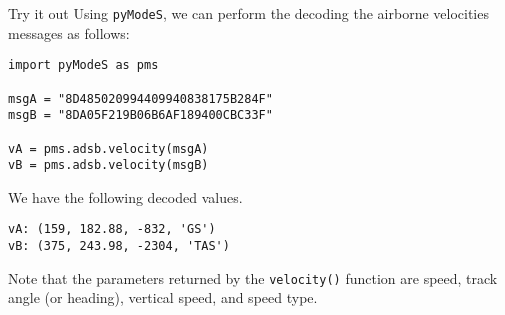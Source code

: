 \begin{notebox}{Try it out}
Using \texttt{pyModeS}, we can perform the decoding the airborne velocities messages as follows: 

\begin{verbatim}
import pyModeS as pms

msgA = "8D485020994409940838175B284F"
msgB = "8DA05F219B06B6AF189400CBC33F"

vA = pms.adsb.velocity(msgA)
vB = pms.adsb.velocity(msgB)
\end{verbatim}

We have the following decoded values.

\begin{verbatim}
vA: (159, 182.88, -832, 'GS')
vB: (375, 243.98, -2304, 'TAS')
\end{verbatim}

Note that the parameters returned by the \texttt{velocity()} function are speed, track angle (or heading), vertical speed, and speed type.

\end{notebox}
  